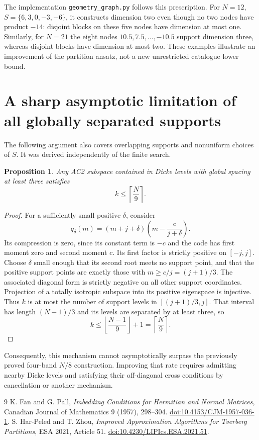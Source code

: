 \documentclass[11pt]{article}
\newtheorem{proposition}{Proposition}
\begin{document}
The implementation \texttt{geometry\_graph.py} follows this prescription.
For $N=12$, $S=\{6,3,0,-3,-6\}$, it constructs dimension two even though
no two nodes have product $-14$: disjoint blocks on these five nodes have
dimension at most one. Similarly, for $N=21$ the eight nodes
$10.5,7.5,\ldots,-10.5$ support dimension three, whereas disjoint blocks
have dimension at most two. These examples illustrate an improvement of
the partition ansatz, not a new unrestricted catalogue lower bound.

\section*{A sharp asymptotic limitation of all globally separated supports}
The following argument also covers overlapping supports and nonuniform
choices of $S$. It was derived independently of the finite search.
\begin{proposition}
Any AC2 subspace contained in Dicke levels with global spacing at least
three satisfies
\[
 k\le\left\lceil\frac N9\right\rceil.
\]
\end{proposition}
\begin{proof}
For a sufficiently small positive $\delta$, consider
\[
 q_\delta(m)=(m+j+\delta)
              \left(m-\frac{c}{j+\delta}\right).
\]
Its compression is zero, since its constant term is $-c$ and the code
has first moment zero and second moment $c$. Its first factor is strictly
positive on $[-j,j]$. Choose $\delta$ small enough that its second root
meets no support point, and that the positive support points are exactly
those with $m\ge c/j=(j+1)/3$. The associated diagonal form is strictly
negative on all other support coordinates. Projection of a totally
isotropic subspace into its positive eigenspace is injective. Thus $k$
is at most the number of support levels in $[(j+1)/3,j]$. That interval
has length $(N-1)/3$ and its levels are separated by at least three, so
\[
 k\le\left\lfloor\frac{N-1}{9}\right\rfloor+1
 =\left\lceil\frac N9\right\rceil.
\]
\end{proof}
Consequently, this mechanism cannot asymptotically surpass the previously
proved four-band $N/8$ construction. Improving that rate requires
admitting nearby Dicke levels and satisfying their off-diagonal cross
conditions by cancellation or another mechanism.

\begin{thebibliography}{9}
 K. Fan and G. Pall,
\emph{Imbedding Conditions for Hermitian and Normal Matrices},
Canadian Journal of Mathematics 9 (1957), 298--304.
\href{https://doi.org/10.4153/CJM-1957-036-1}{doi:10.4153/CJM-1957-036-1}.
 S. Har-Peled and T. Zhou,
\emph{Improved Approximation Algorithms for Tverberg Partitions},
ESA 2021, Article 51.
\href{https://doi.org/10.4230/LIPIcs.ESA.2021.51}{doi:10.4230/LIPIcs.ESA.2021.51}.
\end{thebibliography}
\end{document}
